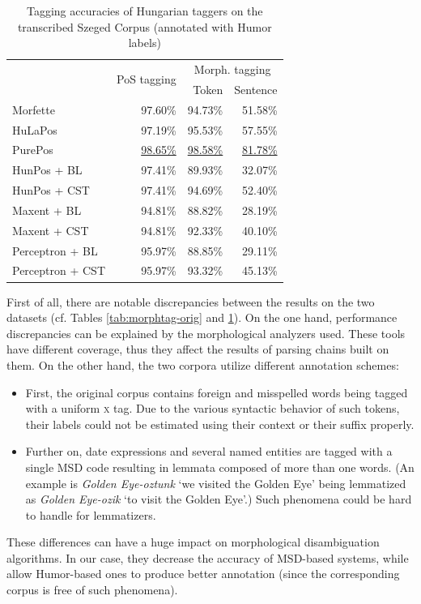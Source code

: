 \begin{table}[H]
 \centering
 \caption{Tagging accuracies of Hungarian taggers on the transcribed Szeged Corpus (annotated with Humor labels)}
\begin{tabular}{l r r r}
  \hline
   & \multirow{2}{*}{PoS tagging} & \multicolumn{2}{c}{Morph. tagging} \\
   & &  Token &  Sentence \\
  \hline
  Morfette &  97.60\% &  94.73\% &  51.58\% \\
  HuLaPos &  97.19\% &  95.53\% &   57.55\% \\
  PurePos &  \underline{98.65\%} &  \underline{98.58\%} &  \underline{81.78\%} \\
  HunPos + BL &  97.41\% &  89.93\% &  32.07\% \\
  HunPos + CST &  97.41\% &  94.69\% &  52.40\% \\
  Maxent + BL &  94.81\% &  88.82\% &  28.19\% \\
  Maxent + CST &  94.81\% &  92.33\% &  40.10\% \\
  Perceptron + BL &  95.97\% &  88.85\% &  29.11\% \\
  Perceptron + CST &  95.97\% &  93.32\% &  45.13\% \\
  \hline
\end{tabular}
\label{tab:morphtag-humor}
\end{table}

First of all, there are notable discrepancies between the results on the two datasets (cf. Tables \ref{tab:morphtag-orig} and \ref{tab:morphtag-humor}). 
On the one hand, performance discrepancies can be explained by the morphological analyzers used.
These tools have different coverage, thus they affect the results of parsing chains built on them.
On the other hand, the two corpora utilize different annotation schemes:
\begin{itemize}
  \item First, the original corpus contains foreign and misspelled words being tagged with a uniform \textsc{x} tag. 
  Due to the various syntactic behavior of such tokens, their labels could not be estimated using their context or their suffix properly.
  \item Further on, date expressions and several named entities are tagged with a single MSD code resulting in lemmata composed of more than one words. (An example is \emph{Golden Eye-oztunk} `we visited the Golden Eye’ being lemmatized as \emph{Golden Eye-ozik} `to visit the Golden Eye’.) 
  Such phenomena could be hard to handle for lemmatizers.
\end{itemize}
These differences can have a huge impact on morphological disambiguation algorithms.
In our case, they decrease the accuracy of MSD-based systems, while allow Humor-based ones to produce better annotation  (since the corresponding corpus is free of such phenomena).

